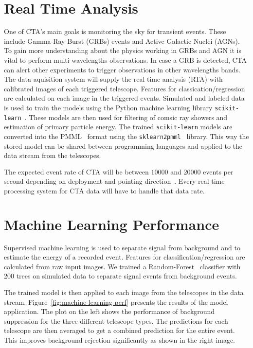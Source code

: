 \documentclass[11pt,twoside]{article}
\begin{document}
\section{Real Time Analysis}

One of CTA's main goals is monitoring the sky for transient events.
These include Gamma-Ray Burst (GRBs) events and Active Galactic Nuclei (AGNs).
To gain more understanding about the physics working in GRBs and AGN it is vital to perform multi-wavelengths observations.
In case a GRB is detected,  CTA can alert other experiments to trigger observations in other wavelengths bands.
The data aquisition system will supply the real time analysis (RTA) with calibrated images of each triggered telescope.
Features for classication/regression are calculated on each image in the triggered events.
Simulated and labeled data is used to train the models using the Python machine learning library \texttt{scikit-learn}~\citep{sklearn}.
These models are then used for filtering of comsic ray showers and estimation of primary particle energy.
The trained \texttt{scikit-learn} models are converted into the PMML~\citep{pmml} format using the \texttt{sklearn2pmml}~\citep{sklearn2pmml} library.
This way the stored model can be shared between programming languages and applied to the data stream from the telescopes.

The expected event rate of CTA will be between $10000$ and $20000$ events per second depending on deployment
and pointing direction~\citep{trigger}. Every real time processing system for CTA data will have to handle that data rate.




\section{Machine Learning Performance}

Supervised machine learning is used to separate signal from background and to estimate the energy of a recorded event.
Features for classification/regression are calculated from raw input images.
We trained a Random-Forest~\citep{rf} classifier with 200 trees on simulated data to separate signal events from background events.

The trained model is then applied to each image from the telescopes in the data stream.
Figure~\ref{fig:machine-learning-perf} presents the results of the model application.
The plot on the left shows the performance of background suppression for the three different telescope types.
The predictions for each telescope are then averaged to get a combined prediction for the entire event.
This improves background rejection significantly as shown in the right image.
\end{document}
